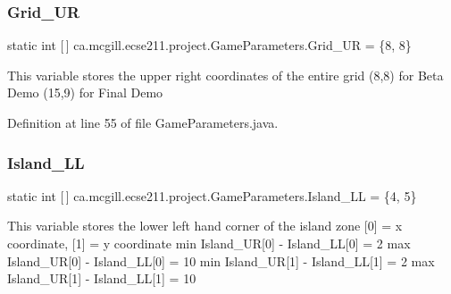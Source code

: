 \mbox{\label{enumca_1_1mcgill_1_1ecse211_1_1project_1_1_game_parameters_afbbca622863f674dfb00dcd93e1328cb}} 
\subsubsection{\texorpdfstring{Grid\+\_\+\+UR}{Grid\_UR}}
{\footnotesize\ttfamily  static  int \mbox{[}$\,$\mbox{]} ca.\+mcgill.\+ecse211.\+project.\+Game\+Parameters.\+Grid\+\_\+\+UR = \{8, 8\}\hspace{0.3cm}{\ttfamily [static]}}

This variable stores the upper right coordinates of the entire grid (8,8) for Beta Demo (15,9) for Final Demo 

Definition at line 55 of file Game\+Parameters.\+java.

\mbox{\label{enumca_1_1mcgill_1_1ecse211_1_1project_1_1_game_parameters_a70576bc98218fc0b4a7b2d3b2d56ed2b}} 
\subsubsection{\texorpdfstring{Island\+\_\+\+LL}{Island\_LL}}
{\footnotesize\ttfamily  static  int \mbox{[}$\,$\mbox{]} ca.\+mcgill.\+ecse211.\+project.\+Game\+Parameters.\+Island\+\_\+\+LL = \{4, 5\}\hspace{0.3cm}{\ttfamily [static]}}

This variable stores the lower left hand corner of the island zone \mbox{[}0\mbox{]} = x coordinate, \mbox{[}1\mbox{]} = y coordinate min Island\+\_\+\+UR\mbox{[}0\mbox{]} -\/ Island\+\_\+\+LL\mbox{[}0\mbox{]} = 2 max Island\+\_\+\+UR\mbox{[}0\mbox{]} -\/ Island\+\_\+\+LL\mbox{[}0\mbox{]} = 10 min Island\+\_\+\+UR\mbox{[}1\mbox{]} -\/ Island\+\_\+\+LL\mbox{[}1\mbox{]} = 2 max Island\+\_\+\+UR\mbox{[}1\mbox{]} -\/ Island\+\_\+\+LL\mbox{[}1\mbox{]} = 10 

